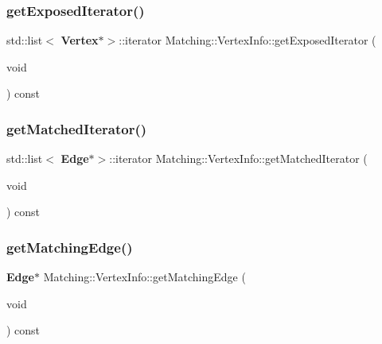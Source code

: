 \subsubsection{get\+Exposed\+Iterator()}
{\footnotesize\ttfamily std\+::list$<$\textbf{ Vertex}$\ast$$>$\+::iterator Matching\+::\+Vertex\+Info\+::get\+Exposed\+Iterator (\begin{DoxyParamCaption}\item[{void}]{ }\end{DoxyParamCaption}) const\hspace{0.3cm}{\ttfamily [inline]}}

\mbox{\label{classMatching_1_1VertexInfo_aa3fa664826f49e975fc983e5b054f06f}} 
\subsubsection{get\+Matched\+Iterator()}
{\footnotesize\ttfamily std\+::list$<$\textbf{ Edge}$\ast$$>$\+::iterator Matching\+::\+Vertex\+Info\+::get\+Matched\+Iterator (\begin{DoxyParamCaption}\item[{void}]{ }\end{DoxyParamCaption}) const\hspace{0.3cm}{\ttfamily [inline]}}

\mbox{\label{classMatching_1_1VertexInfo_a374685ea6d5eee2fa0685539ce48d388}} 
\subsubsection{get\+Matching\+Edge()}
{\footnotesize\ttfamily \textbf{ Edge}$\ast$ Matching\+::\+Vertex\+Info\+::get\+Matching\+Edge (\begin{DoxyParamCaption}\item[{void}]{ }\end{DoxyParamCaption}) const\hspace{0.3cm}{\ttfamily [inline]}}

\mbox{\label{classMatching_1_1VertexInfo_a76e56b1a4b5f41aa9c1bb0781acc393c}} 
